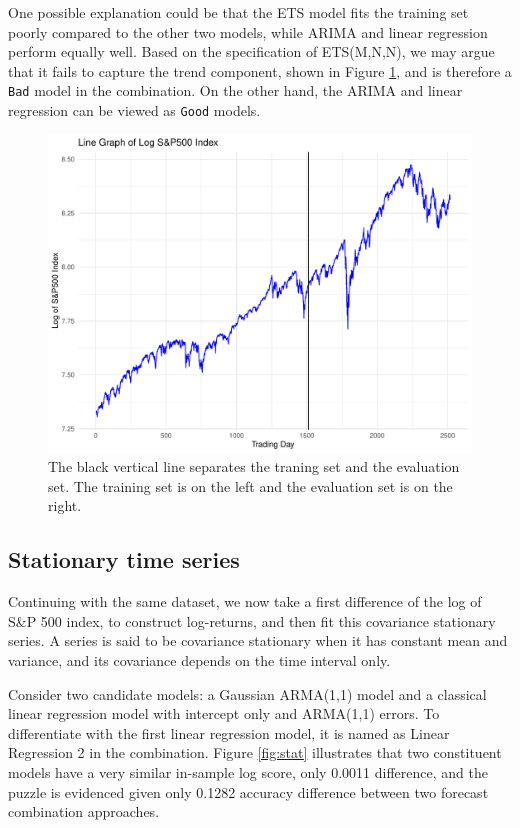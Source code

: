 \documentclass{monashthesis}
\begin{document}
One possible explanation could be that the ETS model fits the training set poorly compared to the other two models, while ARIMA and linear regression perform equally well. Based on the specification of ETS(M,N,N), we may argue that it fails to capture the trend component, shown in Figure \ref{fig:llg}, and is therefore a \texttt{Bad} model in the combination. On the other hand, the ARIMA and linear regression can be viewed as \texttt{Good} models.

\begin{figure}[ht]
\centering
\includegraphics[scale=0.4]{figures/log_linegraph.pdf}
\caption{The black vertical line separates the traning set and the evaluation set. The training set is on the left and the evaluation set is on the right.}
\label{fig:llg}
\end{figure}

\hypertarget{stationary-time-series}{%
\subsection{Stationary time series}\label{stationary-time-series}}

Continuing with the same dataset, we now take a first difference of the log of S\&P 500 index, to construct log-returns, and then fit this covariance stationary series. A series is said to be covariance stationary when it has constant mean and variance, and its covariance depends on the time interval only.

Consider two candidate models: a Gaussian ARMA(1,1) model and a classical linear regression model with intercept only and ARMA(1,1) errors. To differentiate with the first linear regression model, it is named as Linear Regression 2 in the combination. Figure \ref{fig:stat} illustrates that two constituent models have a very similar in-sample log score, only 0.0011 difference, and the puzzle is evidenced given only 0.1282 accuracy difference between two forecast combination approaches.
\end{document}
